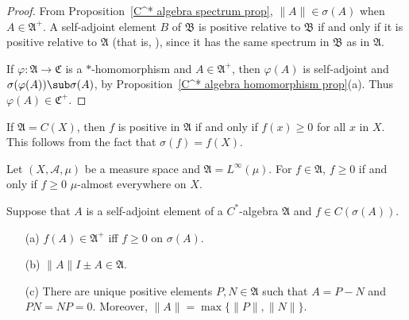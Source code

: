 \begin{proof}
From Proposition~\ref{C^* algebra spectrum prop}, $\|A\|\in\sigma(A)$ when $A\in\mathfrak{A}^+$. A self-adjoint element $B$ of $\mathfrak{B}$ is positive relative to $\mathfrak{B}$ if and only if it is positive relative to $\mathfrak{A}$ (that is, ), since it has the same spectrum in $\mathfrak{B}$ as in $\mathfrak{A}$.\par
If $\varphi:\mathfrak{A}\to\mathfrak{C}$ is a $*$-homomorphism and $A\in\mathfrak{A}^+$, then $\varphi(A)$ is self-adjoint and $\sigma(\varphi(A))\sub\sigma(A)$, by Proposition~\ref{C^* algebra homomorphism prop}(a). Thus $\varphi(A)\in\mathfrak{C}^+$.
\end{proof}
\begin{example}
If $\mathfrak{A}=C(X)$, then $f$ is positive in $\mathfrak{A}$ if and only if $f(x)\geq 0$ for all $x$ in $X$. This follows from the fact that $\sigma(f)=f(X)$.
\end{example}
\begin{example}
Let $(X,\mathcal{A},\mu)$ be a measure space and $\mathfrak{A}=L^\infty(\mu)$. For $f\in\mathfrak{A}$, $f\geq 0$ if and only if $f\geq 0$ $\mu$-almost everywhere on $X$.
\end{example}
\begin{proposition}\label{C^* algebra slef-adjoint positive negative}
Suppose that $A$ is a self-adjoint element of a $C^*$-algebra $\mathfrak{A}$ and $f\in C(\sigma(A))$.
\begin{itemize}
\item[(a)] $f(A)\in\mathfrak{A}^+$ iff $f\geq 0$ on $\sigma(A)$.
\item[(b)] $\|A\|I\pm A\in\mathfrak{A}$.
\item[(c)] There are unique positive elements $P,N\in\mathfrak{A}$ such that $A=P-N$ and $PN=NP=0$. Moreover, $\|A\|=\max\{\|P\|,\|N\|\}$.
\end{itemize}
\end{proposition}
